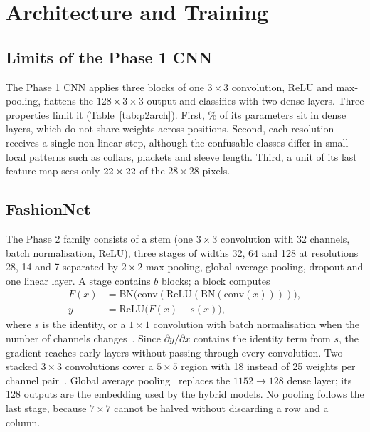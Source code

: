 \section{Architecture and Training}
\label{sec:p2arch}
\subsection{Limits of the Phase 1 CNN}
The Phase 1 CNN applies three blocks of one $3\times3$ convolution, ReLU and max-pooling, flattens the
$128\times3\times3$ output and classifies with two dense layers. Three properties limit it
(Table~\ref{tab:p2arch}). First, \DenseSharePone\% of its \ParamsPone{} parameters sit in dense layers, which do
not share weights across positions. Second, each resolution receives a single non-linear step, although the
confusable classes differ in small local patterns such as collars, plackets and sleeve length. Third, a unit of its
last feature map sees only $22\times22$ of the $28\times28$ pixels.

\subsection{FashionNet}
The Phase 2 family consists of a stem (one $3\times3$ convolution with 32 channels, batch normalisation, ReLU),
three stages of widths 32, 64 and 128 at resolutions 28, 14 and 7 separated by $2\times2$ max-pooling, global
average pooling, dropout and one linear layer. A stage contains $b$ blocks; a block computes
\begin{align}
F(x) &= \mathrm{BN}\bigl(\mathrm{conv}(\mathrm{ReLU}(\mathrm{BN}(\mathrm{conv}(x))))\bigr), \nonumber\\
y &= \mathrm{ReLU}\bigl(F(x) + s(x)\bigr),
\label{eq:p2block}
\end{align}
where $s$ is the identity, or a $1\times1$ convolution with batch normalisation when the number of channels
changes~\cite{he2016deep}. Since $\partial y/\partial x$ contains the identity term from $s$, the gradient reaches
early layers without passing through every convolution. Two stacked $3\times3$ convolutions cover a $5\times5$
region with 18 instead of 25 weights per channel pair~\cite{simonyan2015very}. Global average
pooling~\cite{lin2014network} replaces the $1152\rightarrow128$ dense layer; its 128 outputs are the embedding used
by the hybrid models. No pooling follows the last stage, because $7\times7$ cannot be halved without discarding a
row and a column.

